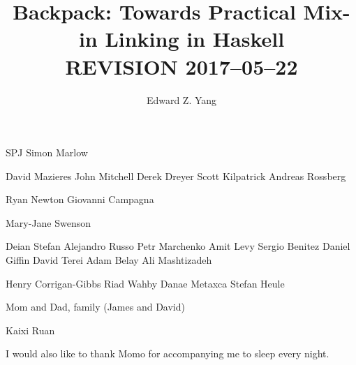 \documentclass{report}
\begin{document}
\title{Backpack: Towards Practical Mix-in Linking in Haskell \\ REVISION 2017--05--22}
\author{Edward Z. Yang}

\beforepreface%
    SPJ
    Simon Marlow

    David Mazieres
    John Mitchell
    Derek Dreyer
    Scott Kilpatrick
    Andreas Rossberg

    Ryan Newton
    Giovanni Campagna

    Mary-Jane Swenson

    Deian Stefan
    Alejandro Russo
    Petr Marchenko
    Amit Levy
    Sergio Benitez
    Daniel Giffin
    David Terei
    Adam Belay
    Ali Mashtizadeh

    Henry Corrigan-Gibbs
    Riad Wahby
    Danae Metaxca
    Stefan Heule

    Mom and Dad, family (James and David)

    Kaixi Ruan

    I would also like to thank Momo for accompanying me to sleep every
    night.
\afterpreface%
















\end{document}
